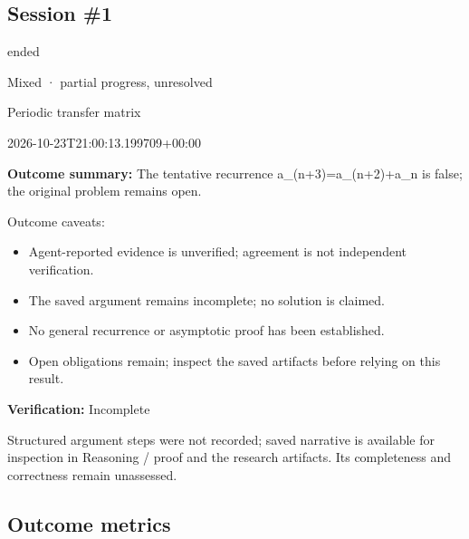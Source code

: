 \documentclass[11pt]{article}
\begin{document}
\subsection{Session \#1}
\begin{description}[style=nextline,font=\normalfont\bfseries,leftmargin=0pt,labelsep=0pt]
\item[Execution status] ended
\item[Outcome] Mixed · partial progress, unresolved
\item[Strategy] Periodic transfer matrix
\item[Started] 2026-10-23T21:00:13.199709+00:00
\end{description}
\textbf{Outcome summary:} The tentative recurrence a\_(n+3)=a\_(n+2)+a\_n is false; the original problem remains open.\par
Outcome caveats:\par
\begin{itemize}
\item Agent-reported evidence is unverified; agreement is not independent verification.
\item The saved argument remains incomplete; no solution is claimed.
\item No general recurrence or asymptotic proof has been established.
\item Open obligations remain; inspect the saved artifacts before relying on this result.
\end{itemize}
\textbf{Verification:} Incomplete\par
Structured argument steps were not recorded; saved narrative is available for inspection in Reasoning / proof and the research artifacts. Its completeness and correctness remain unassessed.\par
\subsection{Outcome metrics}
\end{document}

